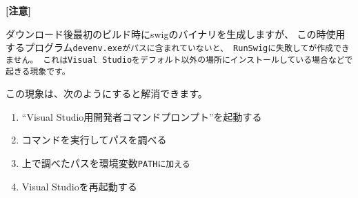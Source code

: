 \bigskip
\thinrule{\linewidth}

\bf{[注意]}

ダウンロード後最初のビルド時にswigのバイナリを生成しますが、
この時使用するプログラム\tt{devenv.exe}がパスに含まれていないと、
RunSwigに失敗して\SprLib が作成できません。
これはVisual Studioをデフォルト以外の場所にインストールしている場合などで起きる現象です。

この現象は、次のようにすると解消できます。

\begin{enumerate}
  \item	``Visual Studio用開発者コマンドプロンプト''を起動する
  \item	コマンドを実行してパスを調べる
  \item	上で調べたパスを環境変数\tt{PATH}に加える
  \item	Visual Studioを再起動する
\end{enumerate}


